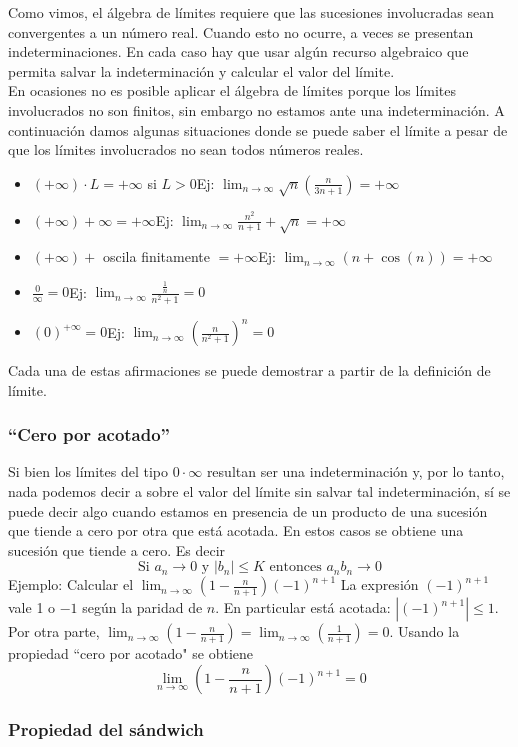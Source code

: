 \documentclass[../Teoría.root.tex]{subfiles}
\begin{document}
Como vimos, el álgebra de límites requiere que las sucesiones involucradas sean convergentes a un número real.
Cuando esto no ocurre, a veces se presentan indeterminaciones.
En cada caso hay que usar algún recurso algebraico que permita salvar la indeterminación y calcular el valor del límite.\\
En ocasiones no es posible aplicar el álgebra de límites porque los límites involucrados no son finitos, sin embargo no estamos ante una indeterminación.
A continuación damos algunas situaciones donde se puede saber el límite a pesar de que los límites involucrados no sean todos números reales.
\begin{itemize}
    \item \((+\infty)\cdot L=+\infty\) si \(L>0\)\tab Ej:
          \(\lim_{n\to\infty}\sqrt{n}\left(\frac{n}{3n+1}\right)=+\infty\)
    \item \((+\infty)+\infty=+\infty\)\tab Ej:
          \(\lim_{n\to\infty}\frac{n^2}{n+1}+\sqrt{n}=+\infty\)
    \item \((+\infty)+\) oscila finitamente \(=+\infty\)\tab Ej:
          \(\lim_{n\to\infty}(n+\cos(n))=+\infty\)
    \item \(\frac{0}{\infty}=0\)\tab Ej:
          \(\lim_{n\to\infty}\frac{\frac{1}{n}}{n^2+1}=0\)
    \item \((0)^{+\infty}=0\)\tab Ej:
          \(\lim_{n\to\infty}\left(\frac{n}{n^2+1}\right)^n=0\)
\end{itemize}
Cada una de estas afirmaciones se puede demostrar a partir de la definición de límite.
\subsubsection{``Cero por acotado''}
Si bien los límites del tipo \(0\cdot\infty\) resultan ser una indeterminación y, por lo tanto, nada podemos decir a sobre el valor del límite sin salvar tal indeterminación, sí se puede decir algo cuando estamos en presencia de un producto de una sucesión que tiende a cero por otra que está acotada.
En estos casos se obtiene una sucesión que tiende a cero.
Es decir \[\text{Si }a_n\rightarrow0\text{ y }|b_n|\leq K\text{ entonces }a_nb_n\rightarrow0\]
Ejemplo: Calcular el \(\lim_{n\to\infty}\left(1-\frac{n}{n+1}\right)(-1)^{n+1}\)
La expresión \((-1)^{n+1}\) vale 1 o \(-1\) según la paridad de \(n\).
En particular está acotada: \(|(-1)^{n+1}|\leq1\).
Por otra parte, \(\lim_{n\to\infty}\left(1-\frac{n}{n+1}\right)=\lim_{n\to\infty}\left(\frac{1}{n+1}\right)=0\).
Usando la propiedad ``cero por acotado" se obtiene
\[\lim_{n\to\infty}\left(1-\frac{n}{n+1}\right)(-1)^{n+1}=0\]
\subsubsection{Propiedad del sándwich}
\end{document}
